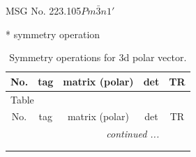 \documentclass[fleqn,8pt]{jsarticle}
\begin{document}
\setcounter{MaxMatrixCols}{32}

\renewcommand{\tablename}{Table~}
\renewcommand{\figurename}{Figure~}
\begin{center}
\LARGE
MSG No. 223.105\quad$Pm\bar{3}n1'$
\end{center}
* symmetry operation
\renewcommand{\arraystretch}{1.3}
\begin{longtable}{ccccc}
\caption{Symmetry operations for 3d polar vector.}
 \\
 \hline \hline
No. & tag & matrix (polar) & det & TR \\ \hline \endfirsthead

\multicolumn{4}{l}{\tablename\ \thetable{}} \\
 \hline \hline
No. & tag & matrix (polar) & det & TR \\ \hline \endhead

 \hline \hline
\multicolumn{4}{r}{\footnotesize\it continued ...} \\ \endfoot

 \hline \hline
\multicolumn{4}{r}{} \\ \endlastfoot


\end{longtable}
\end{document}
